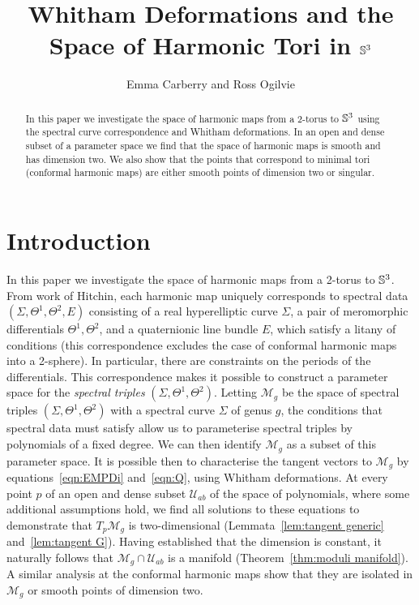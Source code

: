 \documentclass{article}
\begin{document}
\title{Whitham Deformations and the Space of Harmonic Tori in $\S^3$}
\author{Emma Carberry and Ross Ogilvie}
\date{}
\maketitle

\begin{abstract}
In this paper we investigate the space of harmonic maps from a 2-torus to $\S^3$ using the spectral curve correspondence and Whitham deformations. In an open and dense subset of a parameter space we find that the space of harmonic maps is smooth and has dimension two. We also show that the points that correspond to minimal tori (conformal harmonic maps) are either smooth points of dimension two or singular.
\end{abstract}

\section{Introduction}
In this paper we investigate the space of harmonic maps from a 2-torus to $\S^3$. From work of Hitchin\cite{Hitchin1990}, each harmonic map uniquely corresponds to spectral data $(\Sigma,\Theta^1,\Theta^2,E)$ consisting of a real hyperelliptic curve $\Sigma$, a pair of meromorphic differentials $\Theta^1, \Theta^2$, and a quaternionic line bundle $E$, which satisfy a litany of conditions (this correspondence excludes the case of conformal harmonic maps into a 2-sphere). In particular, there are constraints on the periods of the differentials. This correspondence makes it possible to construct a parameter space for the \emph{spectral triples} $(\Sigma, \Theta^1, \Theta^2)$.  Letting $\mathcal{M}_g$ be the space of spectral triples $(\Sigma,\Theta^1,\Theta^2)$ with a spectral curve $\Sigma$ of genus $g$,
the conditions that spectral data must satisfy allow us to parameterise spectral triples by polynomials of a fixed degree. We can then identify $\mathcal{M}_g$ as a subset of this parameter space. It is possible then to characterise the tangent vectors to $\mathcal{M}_g$ by equations~\eqref{eqn:EMPDi} and~\eqref{eqn:Q}, using Whitham deformations. At every point $p$ of an open and dense subset $\mathcal{U}_{ab}$ of the space of polynomials, where some additional assumptions hold, we find all solutions to these equations to demonstrate that $T_p\mathcal{M}_g$ is two-dimensional (Lemmata~\ref{lem:tangent generic} and~\ref{lem:tangent G}). Having established that the dimension is constant, it naturally follows that $\mathcal{M}_g\cap \mathcal{U}_{ab}$ is a manifold (Theorem~\ref{thm:moduli manifold}). A similar analysis at the conformal harmonic maps show that they are isolated in $\mathcal{M}_g$ or smooth points of dimension two.
\end{document}
